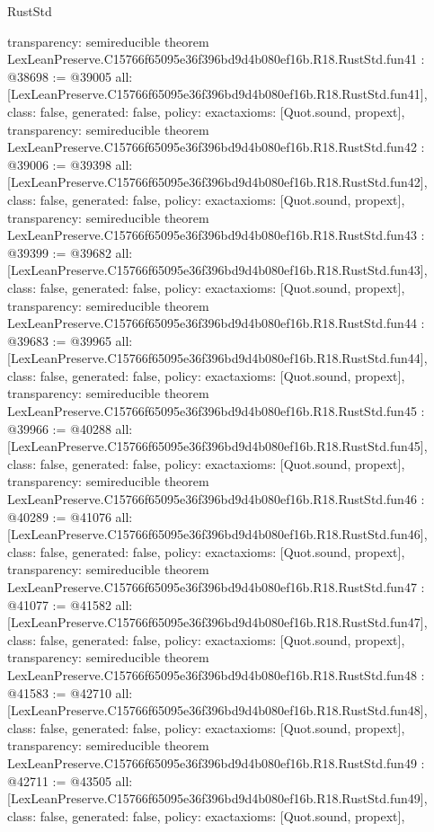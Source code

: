\begin{lexlean}{RustStd}
\begin{coremodule}
{  transparency: semireducible
}
theorem LexLeanPreserve.C15766f65095e36f396bd9d4b080ef16b.R18.RustStd.fun41 : @38698 := @39005 {
  all: [LexLeanPreserve.C15766f65095e36f396bd9d4b080ef16b.R18.RustStd.fun41],
  class: false,
  generated: false,
  policy: exact{axioms: [Quot.sound, propext]},
  transparency: semireducible
}
theorem LexLeanPreserve.C15766f65095e36f396bd9d4b080ef16b.R18.RustStd.fun42 : @39006 := @39398 {
  all: [LexLeanPreserve.C15766f65095e36f396bd9d4b080ef16b.R18.RustStd.fun42],
  class: false,
  generated: false,
  policy: exact{axioms: [Quot.sound, propext]},
  transparency: semireducible
}
theorem LexLeanPreserve.C15766f65095e36f396bd9d4b080ef16b.R18.RustStd.fun43 : @39399 := @39682 {
  all: [LexLeanPreserve.C15766f65095e36f396bd9d4b080ef16b.R18.RustStd.fun43],
  class: false,
  generated: false,
  policy: exact{axioms: [Quot.sound, propext]},
  transparency: semireducible
}
theorem LexLeanPreserve.C15766f65095e36f396bd9d4b080ef16b.R18.RustStd.fun44 : @39683 := @39965 {
  all: [LexLeanPreserve.C15766f65095e36f396bd9d4b080ef16b.R18.RustStd.fun44],
  class: false,
  generated: false,
  policy: exact{axioms: [Quot.sound, propext]},
  transparency: semireducible
}
theorem LexLeanPreserve.C15766f65095e36f396bd9d4b080ef16b.R18.RustStd.fun45 : @39966 := @40288 {
  all: [LexLeanPreserve.C15766f65095e36f396bd9d4b080ef16b.R18.RustStd.fun45],
  class: false,
  generated: false,
  policy: exact{axioms: [Quot.sound, propext]},
  transparency: semireducible
}
theorem LexLeanPreserve.C15766f65095e36f396bd9d4b080ef16b.R18.RustStd.fun46 : @40289 := @41076 {
  all: [LexLeanPreserve.C15766f65095e36f396bd9d4b080ef16b.R18.RustStd.fun46],
  class: false,
  generated: false,
  policy: exact{axioms: [Quot.sound, propext]},
  transparency: semireducible
}
theorem LexLeanPreserve.C15766f65095e36f396bd9d4b080ef16b.R18.RustStd.fun47 : @41077 := @41582 {
  all: [LexLeanPreserve.C15766f65095e36f396bd9d4b080ef16b.R18.RustStd.fun47],
  class: false,
  generated: false,
  policy: exact{axioms: [Quot.sound, propext]},
  transparency: semireducible
}
theorem LexLeanPreserve.C15766f65095e36f396bd9d4b080ef16b.R18.RustStd.fun48 : @41583 := @42710 {
  all: [LexLeanPreserve.C15766f65095e36f396bd9d4b080ef16b.R18.RustStd.fun48],
  class: false,
  generated: false,
  policy: exact{axioms: [Quot.sound, propext]},
  transparency: semireducible
}
theorem LexLeanPreserve.C15766f65095e36f396bd9d4b080ef16b.R18.RustStd.fun49 : @42711 := @43505 {
  all: [LexLeanPreserve.C15766f65095e36f396bd9d4b080ef16b.R18.RustStd.fun49],
  class: false,
  generated: false,
  policy: exact{axioms: [Quot.sound, propext]},
}
\end{coremodule}
\end{lexlean}
